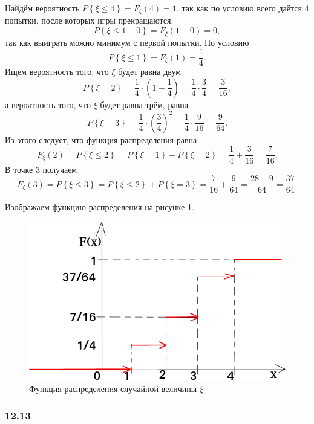 Найдём вероятность $P \left\{ \xi \leq 4 \right\} = F_{ \xi } \left( 4 \right) = 1$, так как по условию всего даётся 4 попытки, после которых игры прекращаются.
$$P \left\{ \xi \leq 1 - 0 \right\} =
F_{ \xi } \left( 1 - 0 \right) =
0,$$
так как выиграть можно минимум с первой попытки.
По условию
$$P \left\{ \xi \leq 1 \right\} =
F_{ \xi } \left( 1 \right) =
\frac{1}{4}.$$
Ищем вероятность того, что $ \xi $ будет равна двум
$$P \left\{ \xi = 2 \right\} =
\frac{1}{4} \cdot \left( 1 - \frac{1}{4} \right) =
\frac{1}{4} \cdot \frac{3}{4} =
\frac{3}{16},$$
а вероятность того, что $ \xi $ будет равна трём, равна
$$P \left\{ \xi = 3 \right\} =
\frac{1}{4} \cdot \left( \frac{3}{4} \right)^2 =
\frac{1}{4} \cdot \frac{9}{16} =
\frac{9}{64}.$$
Из этого следует, что функция распределения равна
$$F_{ \xi } \left( 2 \right) =
P \left\{ \xi \leq 2 \right\} =
P \left\{ \xi = 1 \right\} + P \left\{ \xi = 2 \right\} =
\frac{1}{4} + \frac{3}{16} =
\frac{7}{16}.$$
В точке 3 получаем
$$F_{ \xi } \left( 3 \right) =
P \left\{ \xi \leq 3 \right\} =
P \left\{ \xi \leq 2 \right\} + P \left\{ \xi = 3 \right\} =
\frac{7}{16} + \frac{9}{64} =
\frac{28+9}{64} =
\frac{37}{64}.$$

Изображаем функцию распределения на рисунке \ref{fig:1212}.

\begin{figure}[h!]
  \centering
  \includegraphics[width=1\textwidth]{./pictures/12_12.png}
  \caption{Функция распределения случайной величины $ \xi $}
  \label{fig:1212}
\end{figure}

\subsubsection*{12.13}

